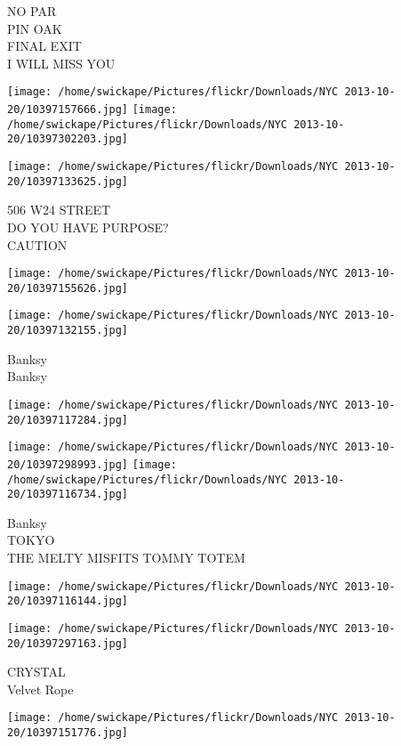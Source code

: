 \documentclass[10pt,letterpaper]{article}
\begin{document}
NO PAR\\
PIN OAK\\
FINAL EXIT\\
I WILL MISS YOU\\
\pagebreak

\texttt{[image: /home/swickape/Pictures/flickr/Downloads/NYC 2013-10-20/10397157666.jpg]}
\texttt{[image: /home/swickape/Pictures/flickr/Downloads/NYC 2013-10-20/10397302203.jpg]}

\texttt{[image: /home/swickape/Pictures/flickr/Downloads/NYC 2013-10-20/10397133625.jpg]}

506 W24 STREET\\
DO YOU HAVE PURPOSE?\\
CAUTION\\
\pagebreak

\texttt{[image: /home/swickape/Pictures/flickr/Downloads/NYC 2013-10-20/10397155626.jpg]}

\vspace{0.25in}
\texttt{[image: /home/swickape/Pictures/flickr/Downloads/NYC 2013-10-20/10397132155.jpg]}

Banksy\\
Banksy\\
\pagebreak

\texttt{[image: /home/swickape/Pictures/flickr/Downloads/NYC 2013-10-20/10397117284.jpg]}

\vspace{0.25in}
\texttt{[image: /home/swickape/Pictures/flickr/Downloads/NYC 2013-10-20/10397298993.jpg]}
\texttt{[image: /home/swickape/Pictures/flickr/Downloads/NYC 2013-10-20/10397116734.jpg]}

Banksy\\
TOKYO\\
THE MELTY MISFITS TOMMY TOTEM\\
\pagebreak

\texttt{[image: /home/swickape/Pictures/flickr/Downloads/NYC 2013-10-20/10397116144.jpg]}

\vspace{0.25in}
\texttt{[image: /home/swickape/Pictures/flickr/Downloads/NYC 2013-10-20/10397297163.jpg]}

CRYSTAL\\
Velvet Rope\\
\pagebreak

\texttt{[image: /home/swickape/Pictures/flickr/Downloads/NYC 2013-10-20/10397151776.jpg]}
\end{document}
